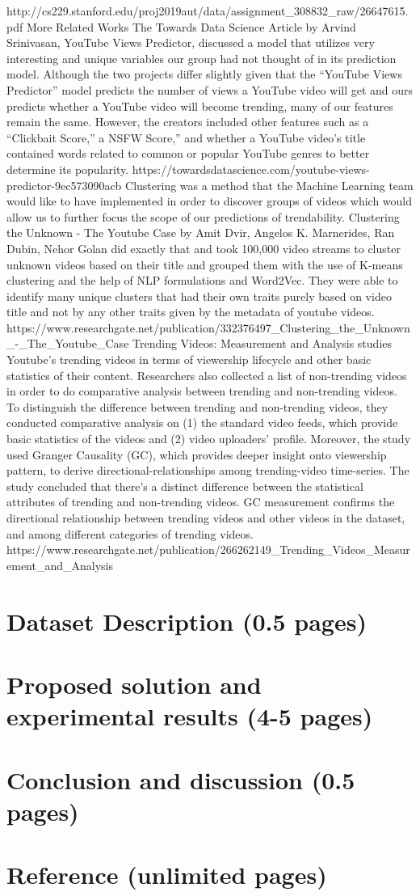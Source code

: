 \documentclass{article}
\begin{document}
 http://cs229.stanford.edu/proj2019aut/data/assignment_308832_raw/26647615.pdf
More Related Works
The Towards Data Science Article by Arvind Srinivasan, YouTube Views Predictor, discussed a model that utilizes very interesting and unique variables our group had not thought of in its prediction model. Although the two projects differ slightly given that the “YouTube Views Predictor” model predicts the number of views a YouTube video will get and ours predicts whether a YouTube video will become trending, many of our features remain the same. However, the creators included other features such as a “Clickbait Score,” a NSFW Score,” and whether a YouTube video’s title contained words related to common or popular YouTube genres to better determine its popularity.  
https://towardsdatascience.com/youtube-views-predictor-9ec573090acb
Clustering was a method that the Machine Learning team would like to have implemented in order to discover groups of videos which would allow us to further focus the scope of our predictions of trendability. Clustering the Unknown - The Youtube Case by Amit Dvir, Angelos K. Marnerides, Ran Dubin, Nehor Golan did exactly that and took 100,000 video streams to cluster unknown videos based on their title and grouped them with the use of K-means clustering and the help of NLP formulations and Word2Vec. They were able to identify many unique clusters that had their own traits purely based on video title and not by any other traits given by the metadata of youtube videos.
https://www.researchgate.net/publication/332376497_Clustering_the_Unknown_-_The_Youtube_Case
Trending Videos: Measurement and Analysis studies Youtube’s trending videos in terms of viewership lifecycle and other basic statistics of their content. Researchers also collected a list of non-trending videos in order to do comparative analysis between trending and non-trending videos. To distinguish the difference between trending and non-trending videos, they conducted comparative analysis on (1) the standard video feeds, which provide basic statistics of the videos and (2) video uploaders’ profile. Moreover, the study used Granger Causality (GC), which provides deeper insight onto viewership pattern, to derive directional-relationships among trending-video time-series. The study concluded that there’s a distinct difference between the statistical attributes of trending and non-trending videos. GC measurement confirms the directional relationship between trending videos and other videos in the dataset, and among different categories of trending videos.
https://www.researchgate.net/publication/266262149_Trending_Videos_Measurement_and_Analysis

\section*{Dataset Description (0.5 pages)}
\section*{Proposed solution and experimental results (4-5 pages)}
\section*{Conclusion and discussion (0.5 pages)}
\section*{Reference (unlimited pages)}
\end{document}
